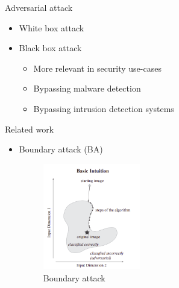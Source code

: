 \documentclass[11pt,t]{beamer}
\begin{document}
\begin{frame}{Adversarial attack}
\begin{itemize}
	\item White box attack
	\item Black box attack
	\begin{itemize}
		\item More relevant in security use-cases
		\item Bypassing malware detection
		\item Bypassing intrusion detection systems
	\end{itemize}
\end{itemize}
\end{frame}



\begin{frame}{Related work}
\begin{itemize}
	\item Boundary attack (BA)
	\vspace{-32pt}
	\hspace{5pt}
	\begin{figure}
	\centering
	\hspace{5pt}
	\includegraphics[width=0.4\textwidth]{graphics/boundary_attack.png}
	\caption{Boundary attack \cite{brendel2018decisionbased}\label{fig:boundary_attack}}
	\footnotesize
	\flushleft
	\end{figure}
\end{itemize}

\end{frame}
\end{document}
